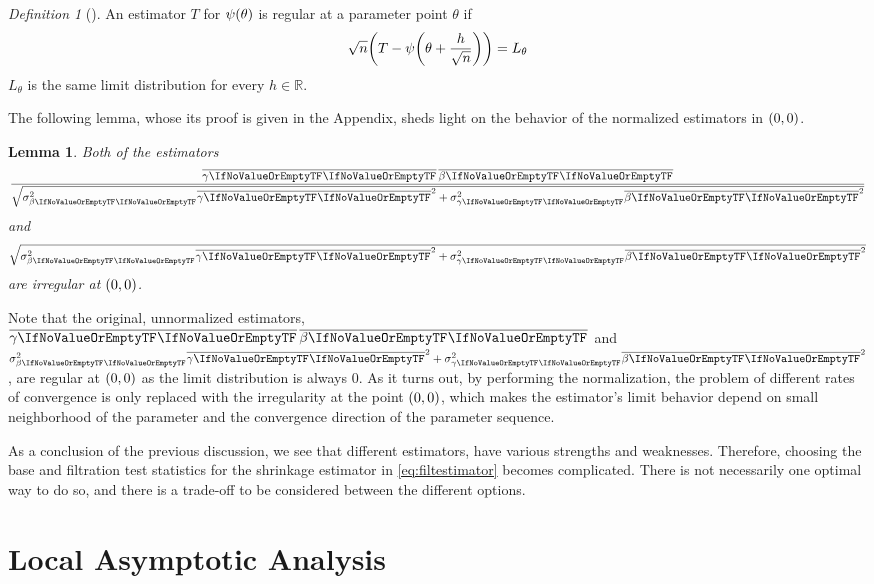 \documentclass[ejs, twoside]{imsart}
\theoremstyle{plain}
\newtheorem{lemma}[theorem]{Lemma}
\theoremstyle{remark}
\newtheorem{definition}[theorem]{Definition}
\newcommand{\real}{\mathbb{R}}
\newcommand{\estim}[1]{\avg{\regcoef{#1}}}
\numberwithin{equation}{section}
\numberwithin{table}{section}
\numberwithin{figure}{section}
\let\originalleft\left
\let\originalright\right
\renewcommand{\left}{\mathopen{}\mathclose\bgroup\originalleft}
\renewcommand{\right}{\aftergroup\egroup\originalright}
\begin{document}
\begin{definition}[{\citealp[Chapter~8.5]{van_der_vaart_asymptotic_1998}}] \label{def:regest}
	An estimator \(T\) for \(\psi \left( \theta \right) \) is regular at a parameter point \(\theta\) if
	\[\sqrt{n} \left( T - \psi \left( \theta + \frac{h}{\sqrt{n}} \right) \right) = L_\theta \]
	\(L_\theta\) is the same limit distribution for every \(h \in \real\).
\end{definition}

The following lemma, whose its proof is given in the Appendix, sheds light on the behavior of the normalized estimators in \(\left( 0,0\right) \).

\begin{lemma} \label{lem:irregularity}
	Both of the estimators \[\frac{\product}{\sqrt{\sigma_{\regcoef{2}}^2 \estim{1}^2 + \sigma_{\regcoef{1}}^2 \estim{2}^2}}\] and \[\sqrt{\sigma_{\regcoef{2}}^2 \estim{1}^2 + \sigma_{\regcoef{1}}^2 \estim{2}^2}\] are  irregular at \(\left(0,0 \right) \).
\end{lemma}

Note that the original, unnormalized estimators, \(\product\) and \(\sigma_{\regcoef{2}}^2 \estim{1}^2 + \sigma_{\regcoef{1}}^2 \estim{2}^2\), are regular at \(\left(0,0 \right) \) as the limit distribution is always \(0\). As it turns out, by performing the normalization, the problem of different rates of convergence is only replaced with the irregularity at the point \(\left(0,0 \right) \), which makes the estimator's limit behavior depend on small neighborhood of the parameter and the convergence direction of the parameter sequence.


As a conclusion of the previous discussion, we see that different estimators, have various strengths and weaknesses. Therefore, choosing the base and filtration test statistics for the shrinkage estimator in \eqref{eq:filtestimator} becomes complicated. There is not necessarily one optimal way to do so, and there is a trade-off to be considered between the different options.


\section{Local Asymptotic Analysis} \label{sec:la}
\end{document}
